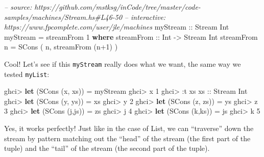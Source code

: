 \documentclass[]{article}
\newenvironment{Shaded}{\begin{snugshade}}{\end{snugshade}}
\newcommand{\CommentTok}[1]{\textcolor[rgb]{0.56,0.35,0.01}{\textit{#1}}}
\newcommand{\DataTypeTok}[1]{\textcolor[rgb]{0.13,0.29,0.53}{#1}}
\newcommand{\DecValTok}[1]{\textcolor[rgb]{0.00,0.00,0.81}{#1}}
\newcommand{\FunctionTok}[1]{\textcolor[rgb]{0.00,0.00,0.00}{#1}}
\newcommand{\KeywordTok}[1]{\textcolor[rgb]{0.13,0.29,0.53}{\textbf{#1}}}
\newcommand{\NormalTok}[1]{#1}
\newcommand{\OtherTok}[1]{\textcolor[rgb]{0.56,0.35,0.01}{#1}}
\begin{document}
\begin{Shaded}
\begin{Highlighting}[]
\CommentTok{-- source: https://github.com/mstksg/inCode/tree/master/code-samples/machines/Stream.hs#L46-50}
\CommentTok{-- interactive: https://www.fpcomplete.com/user/jle/machines}
\OtherTok{myStream ::} \DataTypeTok{Stream} \DataTypeTok{Int}
\NormalTok{myStream }\FunctionTok{=}\NormalTok{ streamFrom }\DecValTok{1}
  \KeywordTok{where}
\OtherTok{    streamFrom ::} \DataTypeTok{Int} \OtherTok{->} \DataTypeTok{Stream} \DataTypeTok{Int}
\NormalTok{    streamFrom n }\FunctionTok{=} \DataTypeTok{SCons}\NormalTok{ ( n, streamFrom (n}\FunctionTok{+}\DecValTok{1}\NormalTok{) )}
\end{Highlighting}
\end{Shaded}

Cool! Let's see if this \texttt{myStream} really does what we want, the same way
we tested \texttt{myList}:

\begin{Shaded}
\begin{Highlighting}[]
\NormalTok{ghci}\FunctionTok{>} \KeywordTok{let}\NormalTok{ (}\DataTypeTok{SCons}\NormalTok{ (x, xs)) }\FunctionTok{=}\NormalTok{ myStream}
\NormalTok{ghci}\FunctionTok{>}\NormalTok{ x}
\DecValTok{1}
\NormalTok{ghci}\FunctionTok{>} \FunctionTok{:}\NormalTok{t xs}
\OtherTok{xs ::} \DataTypeTok{Stream} \DataTypeTok{Int}
\NormalTok{ghci}\FunctionTok{>} \KeywordTok{let}\NormalTok{ (}\DataTypeTok{SCons}\NormalTok{ (y, ys)) }\FunctionTok{=}\NormalTok{ xs}
\NormalTok{ghci}\FunctionTok{>}\NormalTok{ y}
\DecValTok{2}
\NormalTok{ghci}\FunctionTok{>} \KeywordTok{let}\NormalTok{ (}\DataTypeTok{SCons}\NormalTok{ (z, zs)) }\FunctionTok{=}\NormalTok{ ys}
\NormalTok{ghci}\FunctionTok{>}\NormalTok{ z}
\DecValTok{3}
\NormalTok{ghci}\FunctionTok{>} \KeywordTok{let}\NormalTok{ (}\DataTypeTok{SCons}\NormalTok{ (j,js)) }\FunctionTok{=}\NormalTok{ zs}
\NormalTok{ghci}\FunctionTok{>}\NormalTok{ j}
\DecValTok{4}
\NormalTok{ghci}\FunctionTok{>} \KeywordTok{let}\NormalTok{ (}\DataTypeTok{SCons}\NormalTok{ (k,ks)) }\FunctionTok{=}\NormalTok{ js}
\NormalTok{ghci}\FunctionTok{>}\NormalTok{ k}
\DecValTok{5}
\end{Highlighting}
\end{Shaded}

Yes, it works perfectly! Just like in the case of List, we can ``traverse'' down
the stream by pattern matching out the ``head'' of the stream (the first part of
the tuple) and the ``tail'' of the stream (the second part of the tuple).
\end{document}
